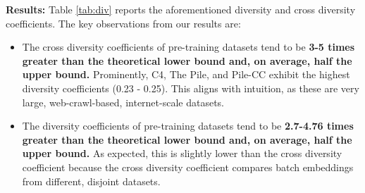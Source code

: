 \documentclass[10pt]{article} %
\begin{document}
\textbf{Results:}
Table \ref{tab:div} reports the aforementioned diversity and cross diversity coefficients. 
The key observations from our results are:
\begin{itemize}
    \item The cross diversity coefficients of pre-training datasets tend to be \textbf{3-5 times greater than the theoretical lower bound and, on average, half the upper bound.} 
    Prominently, C4, The Pile, and Pile-CC exhibit the highest diversity coefficients (0.23 - 0.25). This aligns with intuition, as these are very large, web-crawl-based, internet-scale datasets. 
    \item The diversity coefficients of pre-training datasets tend to be \textbf{2.7-4.76 times greater than the theoretical lower bound and, on average, half the upper bound.}
    As expected, this is slightly lower than the cross diversity coefficient because the cross diversity coefficient compares batch embeddings from different, disjoint datasets.
\end{itemize}
\end{document}

